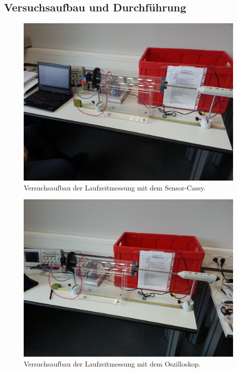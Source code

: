 \documentclass[12pt,a4paper]{article}
\begin{document}
\subsection{Versuchsaufbau und Durchführung}
\begin{figure}[H]
\centering
\includegraphics[scale=0.15]{Bilder/laufzeit-cassy.jpg}
\caption{Versuchsaufbau der Laufzeitmessung mit dem Sensor-Cassy.}
\end{figure}
\begin{figure}[H]
\centering
\includegraphics[scale=0.15]{Bilder/laufzeit-oszi.jpg}
\caption{Versuchsaufbau der Laufzeitmessung mit dem Oszilloskop.}
\end{figure}
\end{document}
